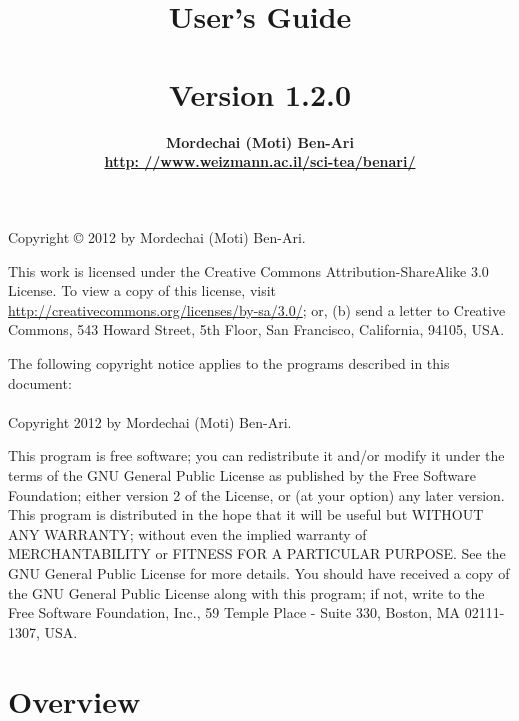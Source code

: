 \documentclass[11pt]{report}
\author{\bfseries Mordechai (Moti) Ben-Ari\\\url{http: //www.weizmann.ac.il/sci-tea/benari/}}
\title{\bfseries \ls\\\mbox{}\\
\bfseries\large User's Guide\\\mbox{}\\
\bfseries\normalsize Version 1.2.0}
\begin{document}
\maketitle

\thispagestyle{empty}

\vspace*{\fill}

\begin{center}
Copyright \copyright{} 2012 by Mordechai (Moti) Ben-Ari.
\end{center}
This work is licensed under the Creative Commons Attribution-ShareAlike 3.0
License. To view a copy of this license, visit
\url{http://creativecommons.org/licenses/by-sa/3.0/}; or, (b) send a letter
to Creative Commons, 543 Howard Street, 5th Floor, San Francisco,
California, 94105, USA.

\bigskip

 
\begin{center}
The following copyright notice applies to the programs described in this
document:\mbox{}\\\mbox{}\\
Copyright 2012 by Mordechai (Moti) Ben-Ari.
\end{center}

This program is free software; you can redistribute it and/or
modify it under the terms of the GNU General Public License
as published by the Free Software Foundation; either version 2
of the License, or (at your option) any later version.
This program is distributed in the hope that it will be useful
but WITHOUT ANY WARRANTY; without even the implied warranty of
MERCHANTABILITY or FITNESS FOR A PARTICULAR PURPOSE.
See the GNU General Public License for more details.
You should have received a copy of the GNU General Public License
along with this program; if not, write to the Free Software
Foundation, Inc., 59 Temple Place - Suite 330, Boston, MA
02111-1307, USA.

\vspace*{\fill}

\tableofcontents

\thispagestyle{empty}

\setcounter{page}{0}


\newpage

\section*{Overview}
\end{document}
